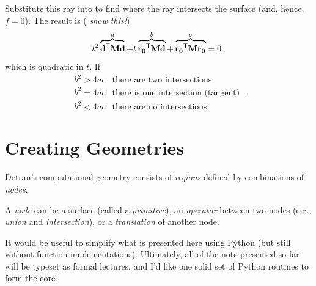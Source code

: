 \vfill
Substitute this ray into  to find
where the ray intersects the surface (and, hence, $f=0$).
The result is (\emph{ show this!})
\begin{equation}
  t^2 \overbrace{\mathbf{d}^{\mathsf{T}} \mathbf{M} \mathbf{d}}^{a}
  + t \overbrace{\mathbf{r_0}^{\mathsf{T}} \mathbf{M} \mathbf{d}}^{b}
  +   \overbrace{\mathbf{r_0}^{\mathsf{T}} \mathbf{M} \mathbf{r_0}}^{c} = 0 \, ,
\end{equation}
which is quadratic in $t$.  If  
\begin{equation*}
  \begin{array}{cc}
      b^2 > 4ac & \text{there are two intersections} \\
      b^2 = 4ac & \text{there is one intersection (tangent)} \\
      b^2 < 4ac & \text{there are no intersections} 
  \end{array}
 \, . 
\end{equation*}


\section*{Creating Geometries}

Detran's computational geometry consists of \emph{ regions} 
defined by combinations of \emph{ nodes}. 

 

A \emph{ node} can be a  surface (called a \emph{ primitive}), 
an \emph{ operator} between two nodes (e.g., \emph{ union} and 
\emph{ intersection}), or a \emph{ translation} of another 
node.

 
It would be useful to simplify what is presented here using 
Python (but still without function implementations).  Ultimately,
all of the note presented so far will be typeset as formal
lectures, and I'd like one solid set of Python routines to 
form the core.
